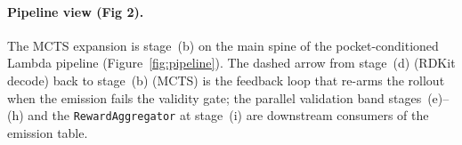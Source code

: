 \paragraph{Pipeline view (Fig 2).}
The MCTS expansion is stage~(b) on the main spine of the
pocket-conditioned Lambda pipeline (Figure~\ref{fig:pipeline}).
The dashed arrow from stage~(d) (RDKit decode) back to stage~(b)
(MCTS) is the feedback loop that re-arms the rollout when the
emission fails the validity gate; the parallel validation band
stages~(e)--(h) and the \texttt{RewardAggregator} at stage~(i)
are downstream consumers of the emission table.


\makeatletter
\let\cite\WForigCiteFourFour
\makeatother